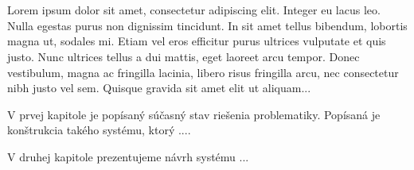 \documentclass[12pt]{article}
\title{\thesistitle}
\author{\thesisauthor}
\begin{document}



\setcounter{page}{3}

%

%




\tableofcontents
\pagebreak

\pagestyle{fancy}
\fancyhead{}
\fancyfoot{}
\fancyfoot[R]{\thepage\hspace{0.4cm}} %


\listoffigures
\pagebreak

\glsaddall %
\printglossary[type=\acronymtype,title={\lnlistabbr}]



\section*{\lnintro} %

Lorem ipsum dolor sit amet, consectetur adipiscing elit. Integer eu lacus leo. Nulla egestas purus non dignissim tincidunt. In sit amet tellus bibendum, lobortis magna ut, sodales mi. Etiam vel eros efficitur purus ultrices vulputate et quis justo. Nunc ultrices tellus a dui mattis, eget laoreet arcu tempor. Donec vestibulum, magna ac fringilla lacinia, libero risus fringilla arcu, nec consectetur nibh justo vel sem. Quisque gravida sit amet elit ut aliquam...\par
\vspace{1em}
\noindent
V prvej kapitole je popísaný súčasný stav riešenia problematiky. Popísaná je konštrukcia takého systému, ktorý ....

\noindent
V druhej kapitole prezentujeme návrh systému ...
\end{document}
